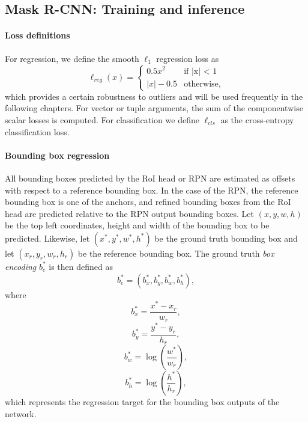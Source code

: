 \subsection{Mask R-CNN: Training and inference}
\paragraph{Loss definitions}
For regression, we define the smooth $\ell_1$ regression loss as
\begin{equation}
\ell_{reg}(x) =
\begin{cases}
0.5x^2 &\text{if |x| < 1} \\
|x| - 0.5 &\text{otherwise,}
\end{cases}
\end{equation}
which provides a certain robustness to outliers and will be used
frequently in the following chapters. For vector or tuple arguments, the sum of the componentwise scalar
losses is computed.
For classification we define $\ell_{cls}$ as the cross-entropy classification loss.

\label{ssec:rcnn_techn}
\paragraph{Bounding box regression}
All bounding boxes predicted by the RoI head or RPN are estimated as offsets
with respect to a reference bounding box. In the case of the RPN,
the reference bounding box is one of the anchors, and refined bounding boxes from the RoI head are
predicted relative to the RPN output bounding boxes.
Let $(x, y, w, h)$ be the top left coordinates, height and width of the bounding box
to be predicted. Likewise, let $(x^*, y^*, w^*, h^*)$ be the ground truth bounding
box and let $(x_r, y_r, w_r, h_r)$ be the reference bounding box.
The ground truth \emph{box encoding} $b_e^*$ is then defined as
\begin{equation}
b_e^* = (b_x^*, b_y^*, b_w^*, b_h^*),
\end{equation}
where
\begin{equation*}
b_x^* = \frac{x^* - x_r}{w_r},
\end{equation*}
\begin{equation*}
b_y^* = \frac{y^* - y_r}{h_r},
\end{equation*}
\begin{equation*}
b_w^* = \log \left( \frac{w^*}{w_r} \right),
\end{equation*}
\begin{equation*}
b_h^* = \log \left( \frac{h^*}{h_r} \right),
\end{equation*}
which represents the regression target for the bounding box
outputs of the network.

